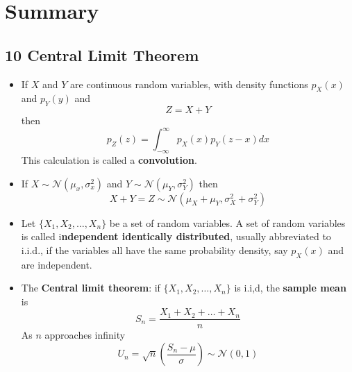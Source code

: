 \ifind
\section*{Summary}
\else
\subsection*{10 Central Limit Theorem}
\fi

\begin{itemize}
\item If $X$ and $Y$ are continuous random variables, with density
functions $p_X(x)$ and $p_Y(y)$ and 
\begin{equation}
Z=X+Y
\end{equation}
then
\begin{equation}
p_Z(z)=\int_{-\infty}^\infty {p_X(x)p_Y(z-x)dx}
\end{equation}
This calculation is called a \textbf{convolution}.

\item If  $X\sim\mathcal{N}(\mu_x,\sigma_x^2)$ and $Y\sim\mathcal{N}(\mu_Y,\sigma_Y^2)$ then
  \begin{equation}
X+Y=Z\sim \mathcal{N}(\mu_X+\mu_Y,\sigma_X^2+\sigma_Y^2)
  \end{equation}

\item Let $\{X_1,X_2,\ldots,X_n\}$ be a set of random variables. A set of
random variables is called i\textbf{ndependent identically distributed},
usually abbreviated to i.i.d., if the variables all have the same
probability density, say $p_X(x)$ and are independent.
  
\item The \textbf{Central limit theorem}: if  $\{X_1,X_2,\ldots,X_n\}$ is i.i,d, the \textbf{sample mean} is
  \begin{equation}
S_n=\frac{X_1+X_2+\ldots+X_n}{n}
\end{equation}
  As $n$ approaches infinity
\begin{equation}
U_n=\sqrt{n}\left(\frac{S_n-\mu}{\sigma}\right) \sim \mathcal{N}(0,1)
\end{equation}
\end{itemize}
